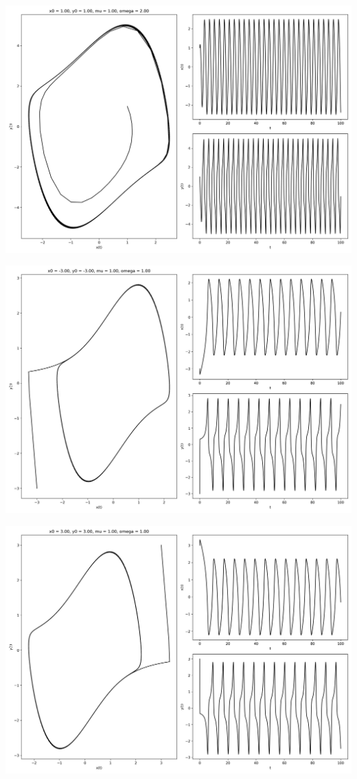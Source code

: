 \documentclass[12pt,a4paper]{jsarticle}
\makeatletter
\def\figcaption{\def\@captype{figure}\caption}
\makeatother
\begin{document}
\figcaption{$x_0=1.00, y_0=1.00, \mu=1.00, \omega=0.25$}
\includegraphics[draft, scale=0.33]{x1_0y1_0mu1_0omega2_0.png}
\figcaption{$x_0=1.00, y_0=1.00, \mu=1.00, \omega=2.00$}
\includegraphics[draft, scale=0.33]{x-3_0y-3_0mu1_0omega1_0.png}
\figcaption{$x_0=-3.00, y_0=-3.00, \mu=1.00, \omega=1.00$}
\includegraphics[draft, scale=0.33]{x3_0y3_0mu1_0omega1_0.png}
\figcaption{$x_0=3.00, y_0=3.00, \mu=1.00, \omega=1.00$}
\end{document}
